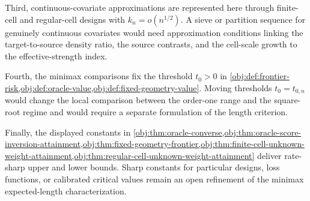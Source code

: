 Third, continuous-covariate approximations are represented here through finite-cell and regular-cell designs with \(k_n=o(n^{1/2})\). A sieve or partition sequence for genuinely continuous covariates would need approximation conditions linking the target-to-source density ratio, the source contrasts, and the cell-scale growth to the effective-strength index.

Fourth, the minimax comparisons fix the threshold \(t_0>0\) in \cref{obj:def:frontier-risk,obj:def:oracle-value,obj:def:fixed-geometry-value}. Moving thresholds \(t_0=t_{0,n}\) would change the local comparison between the order-one range and the square-root regime and would require a separate formulation of the length criterion.

Finally, the displayed constants in \cref{obj:thm:oracle-converse,obj:thm:oracle-score-inversion-attainment,obj:thm:fixed-geometry-frontier,obj:thm:finite-cell-unknown-weight-attainment,obj:thm:regular-cell-unknown-weight-attainment} deliver rate-sharp upper and lower bounds. Sharp constants for particular designs, loss functions, or calibrated critical values remain an open refinement of the minimax expected-length characterization.
